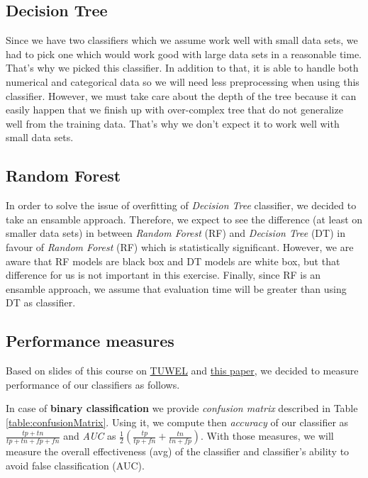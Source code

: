 \documentclass[11pt,a4paper,titlepage]{article}
\begin{document}
\subsection{Decision Tree}
Since we have two classifiers which we assume work well with small data sets, we had to pick one which would work good with large data sets in a reasonable time. That's why we picked this classifier. In addition to that, it is able to handle both numerical and categorical data so we will need less preprocessing when using this classifier. However, we must take care about the depth of the tree because it can easily happen that we finish up with over-complex tree that do not generalize well from the training data. That's why we don't expect it to work well with small data sets.

\subsection{Random Forest}
In order to solve the issue of overfitting of \textit{Decision Tree} classifier, we decided to take an ensamble approach. Therefore, we expect to see the difference (at least on smaller data sets) in between \textit{Random Forest} (RF) and \textit{Decision Tree} (DT) in favour of \textit{Random Forest} (RF) which is statistically significant. However, we are aware that RF models are black box and DT models are white box, but that difference for us is not important in this exercise. Finally, since RF is an ensamble approach, we assume that evaluation time will be greater than using DT as classifier.

\subsection{Performance measures}
Based on slides of this course on \href{tuwel.tuwien.ac.at}{TUWEL} and \href{http://rali.iro.umontreal.ca/rali/sites/default/files/publis/SokolovaLapalme-JIPM09.pdf}{this paper}, we decided to measure performance of our classifiers as follows.

In case of \textbf{binary classification} we  provide \textit{confusion matrix} described in Table \ref{table:confusionMatrix}. Using it, we compute then \textit{accuracy} of our classifier as $\frac{tp + tn}{tp + tn + fp + fn}$ and \textit{AUC} as $\frac{1}{2} (\frac{tp}{tp + fn} + \frac{tn}{tn+fp})$.  With those measures, we will measure the overall effectiveness (avg) of the classifier and classifier’s ability to avoid false classification (AUC).
\end{document}
